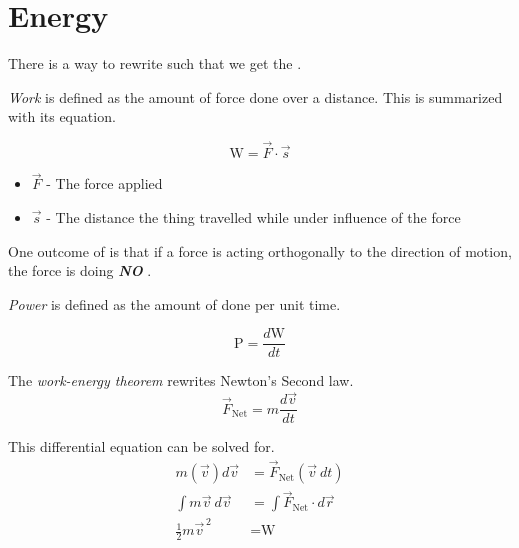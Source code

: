 \section{Energy} \label{sec:Energy}
There is a way to rewrite  such that we get the .

\begin{definition}[Work] \label{def:Work}
  \emph{Work} is defined as the amount of force done over a distance.
  This is summarized with its equation.

  \begin{equation} \label{eq:Work}
    \text{W} = \vec{F} \cdot \vec{s}
  \end{equation}
  \begin{itemize}[noitemsep, nolistsep]
    \item $\vec{F}$ - The force applied
    \item $\vec{s}$ - The distance the thing travelled while under influence of the force
  \end{itemize}

  \begin{remark}
    One outcome of  is that if a force is acting orthogonally to the direction of motion, the force is doing \textbf{\emph{NO}} .
  \end{remark}
\end{definition}

\begin{definition}[Power] \label{def:Power}
  \emph{Power} is defined as the amount of  done per unit time.

  \begin{equation} \label{eq:Power}
    \text{P} = \frac{d \text{W}}{dt}
  \end{equation}
\end{definition}

\begin{definition} \label{def:Work Kinetic Energy Theorem}
  The \emph{work-energy theorem} rewrites Newton's Second law.
  \begin{equation*}
    \vec{F}_{\text{Net}} = m \frac{d \vec{v}}{dt}
  \end{equation*}

  This differential equation can be solved for.
  \begin{align*}
    m \left( \vec{v} \right) d \vec{v} &= \vec{F}_{\text{Net}} \left( \vec{v} \: dt \right) \\
    \int m \vec{v} \: d \vec{v} &= \int \vec{F}_{\text{Net}} \cdot d \vec{r} \\ %
    \frac{1}{2} m \vec{v}^{\,2} &= \text{W} %
  \end{align*}
\end{definition}

